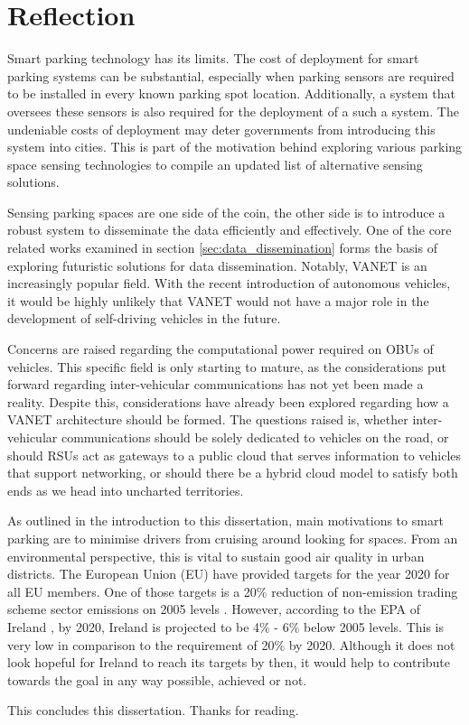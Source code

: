 \section{Reflection}
Smart parking technology has its limits. The cost of deployment for smart parking systems can be substantial, especially when parking sensors are required to be installed in every known parking spot location. Additionally, a system that oversees these sensors is also required for the deployment of a such a system. The undeniable costs of deployment may deter governments from introducing this system into cities. This is part of the motivation behind exploring various parking space sensing technologies to compile an updated list of alternative sensing solutions.

Sensing parking spaces are one side of the coin, the other side is to introduce a robust system to disseminate the data efficiently and effectively. One of the core related works examined in section \ref{sec:data_dissemination} forms the basis of exploring futuristic solutions for data dissemination. Notably, \ac{VANET} is an increasingly popular field. With the recent introduction of autonomous vehicles, it would be highly unlikely that \ac{VANET} would not have a major role in the development of self-driving vehicles in the future.

Concerns are raised regarding the computational power required on \ac{OBU}s of vehicles. This specific field is only starting to mature, as the considerations put forward regarding inter-vehicular communications has not yet been made a reality. Despite this, considerations have already been explored regarding how a \ac{VANET} architecture should be formed. The questions raised is, whether inter-vehicular communications should be solely dedicated to vehicles on the road, or should \ac{RSU}s act as gateways to a public cloud that serves information to vehicles that support networking, or should there be a hybrid cloud model to satisfy both ends as we head into uncharted territories.

As outlined in the introduction to this dissertation, main motivations to smart parking are to minimise drivers from cruising around looking for spaces. From an environmental perspective, this is vital to sustain good air quality in urban districts. The European Union (EU) have provided targets for the year 2020 for all EU members. One of those targets is a 20\% reduction of non-emission trading scheme sector emissions on 2005 levels \citep{Pereira2005OverviewTargets}. However, according to the \ac{EPA} of Ireland \citep{Gas2017EPAProjections}, by 2020, Ireland is projected to be 4\% - 6\% below 2005 levels. This is very low in comparison to the requirement of 20\% by 2020. Although it does not look hopeful for Ireland to reach its targets by then, it would help to contribute towards the goal in any way possible, achieved or not.

This concludes this dissertation. Thanks for reading.